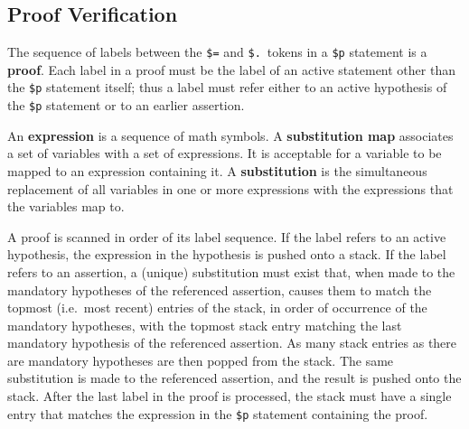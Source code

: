 \subsection{Proof Verification}\label{spec4}

The sequence of labels between the \texttt{\$=} and \texttt{\$.}\ tokens
in a \texttt{\$p} statement is a {\bf proof}. Each
label in a proof must be the label of an active statement other than the
\texttt{\$p} statement itself; thus a label must refer either to an
active hypothesis of the \texttt{\$p} statement or to an earlier
assertion.

An {\bf expression} is a sequence of math symbols. A {\bf
substitution map} associates a set of variables with a
set of expressions.  It is acceptable for a variable to be mapped to an
expression containing it.  A {\bf
substitution} is the
simultaneous replacement of all variables in one or more expressions with the
expressions that the variables map to.

A proof is scanned in order of its label sequence.  If the label refers to an
active hypothesis, the expression in the hypothesis is pushed onto a
stack.  If the label refers to an assertion, a
(unique) substitution must exist that, when made to the mandatory hypotheses
of the referenced assertion, causes them to match the topmost (i.e.\ most
recent) entries of the stack, in order of occurrence of the mandatory
hypotheses, with the topmost stack entry matching the last mandatory
hypothesis of the referenced assertion.  As many stack entries as there are
mandatory hypotheses are then popped from the stack.  The same substitution is
made to the referenced assertion, and the result is pushed onto the stack.
After the last label in the proof is processed, the stack must have a single
entry that matches the expression in the \texttt{\$p} statement containing the
proof.

